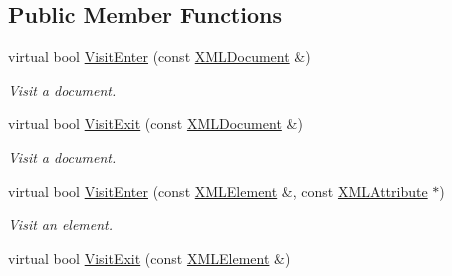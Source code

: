 \subsection*{Public Member Functions}
\begin{DoxyCompactItemize}
\item 
\mbox{\label{classCPlantBox_1_1tinyxml2_1_1XMLVisitor_a50f36dc64a24f33288a4b18a70a86d73}} 
virtual bool \hyperlink{classCPlantBox_1_1tinyxml2_1_1XMLVisitor_a50f36dc64a24f33288a4b18a70a86d73}{Visit\+Enter} (const \hyperlink{classCPlantBox_1_1tinyxml2_1_1XMLDocument}{X\+M\+L\+Document} \&)
\begin{DoxyCompactList}\small\item\em Visit a document. \end{DoxyCompactList}\item 
\mbox{\label{classCPlantBox_1_1tinyxml2_1_1XMLVisitor_aca4d51366a205ed7dde930c084230ae4}} 
virtual bool \hyperlink{classCPlantBox_1_1tinyxml2_1_1XMLVisitor_aca4d51366a205ed7dde930c084230ae4}{Visit\+Exit} (const \hyperlink{classCPlantBox_1_1tinyxml2_1_1XMLDocument}{X\+M\+L\+Document} \&)
\begin{DoxyCompactList}\small\item\em Visit a document. \end{DoxyCompactList}\item 
\mbox{\label{classCPlantBox_1_1tinyxml2_1_1XMLVisitor_a49f8bd07519735c539843e28f7b26c9b}} 
virtual bool \hyperlink{classCPlantBox_1_1tinyxml2_1_1XMLVisitor_a49f8bd07519735c539843e28f7b26c9b}{Visit\+Enter} (const \hyperlink{classCPlantBox_1_1tinyxml2_1_1XMLElement}{X\+M\+L\+Element} \&, const \hyperlink{classCPlantBox_1_1tinyxml2_1_1XMLAttribute}{X\+M\+L\+Attribute} $\ast$)
\begin{DoxyCompactList}\small\item\em Visit an element. \end{DoxyCompactList}\item 
\mbox{\label{classCPlantBox_1_1tinyxml2_1_1XMLVisitor_a42d6e5b670e16d059aac879590bceaba}} 
virtual bool \hyperlink{classCPlantBox_1_1tinyxml2_1_1XMLVisitor_a42d6e5b670e16d059aac879590bceaba}{Visit\+Exit} (const \hyperlink{classCPlantBox_1_1tinyxml2_1_1XMLElement}{X\+M\+L\+Element} \&)

\end{DoxyCompactItemize}

